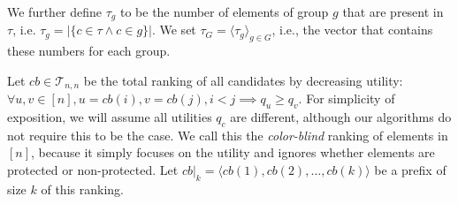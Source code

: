 We further define $\tau_g$ to be the number of elements of group $ g $ that are present in $\tau$, i.e. $\tau_g = | \{ c \in \tau \wedge c \in g \} |$.
%
We set $ \tau_G = \langle\tau_g\rangle_{g \in G}$, i.e., the vector that contains these numbers for each group.
%

\textcolor[rgb]{0.00,0.00,1.00}{Let $cb \in {\mathcal T}_{n,n}$ be the total ranking of all candidates by
 decreasing utility: $\forall u,v \in [n], u=cb(i), v = cb(j), i < j \implies q_u \ge q_v$.}
%
For simplicity of exposition, we will assume all utilities $q_c$ are different, although our algorithms do not require this to be the case.
%
We call this the \emph{color-blind} ranking of elements in $[n]$, because it simply focuses on the utility and ignores whether elements are protected or non-protected.
%
Let $\textit{cb}|_k = \langle \textit{cb}(1), \textit{cb}(2), \ldots, \textit{cb}(k) \rangle$ be a prefix of size $k$ of this ranking. \label{concept:color-blind-ranking} 
%

